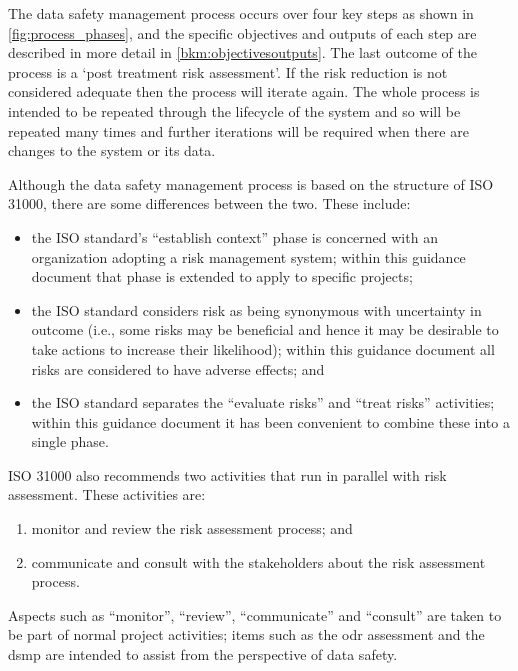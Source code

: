 The data safety management process occurs over four key steps as shown in \autoref{fig:process_phases}, and the specific
objectives and outputs of each step are described in more detail in \autoref{bkm:objectivesoutputs}. The last outcome of the
process is a `post \gls{treatment} risk assessment'. If the risk reduction is not considered adequate then
the process will iterate again. The whole process is intended to be repeated through the lifecycle of
the system and so will be repeated many times and further iterations will be required when there
are changes to the system or its data.

Although the data safety management process is based on the structure of ISO 31000, there are
some differences between the two. These include:
\begin{itemize}
\item the ISO standard’s ``establish context'' phase is concerned with an organization adopting a
	risk management system; within this guidance document that phase is extended to apply to
	specific projects;
\item the ISO standard considers risk as being synonymous with uncertainty in outcome (i.e.,
	some risks may be beneficial and hence it may be desirable to take actions to increase their
	likelihood); within this guidance document all risks are considered to have adverse effects;
	and
\item the ISO standard separates the ``evaluate risks'' and ``treat risks'' activities; within this
	guidance document it has been convenient to combine these into a single phase.
\end{itemize}

ISO 31000 also recommends two activities that run in parallel with risk assessment. These activities
are:
\begin{enumerate}
\item monitor and review the risk assessment process; and 
\item communicate and consult with the
\glspl{stakeholder} about the risk assessment process. 
\end{enumerate}
Aspects such as ``monitor'', ``review'', ``communicate''
and ``consult'' are taken to be part of normal project activities; items such as the \gls{odr} assessment and
the \gls{dsmp} are intended to assist from the perspective of data safety.

